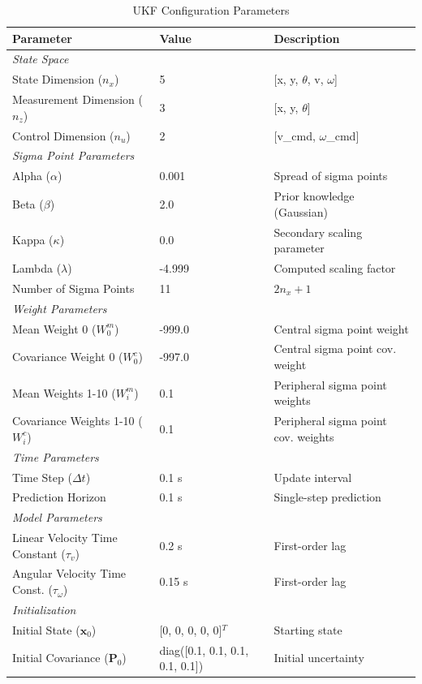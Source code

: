 \begin{table}[htbp]
\centering
\caption{UKF Configuration Parameters}
\label{tab:ukf_params}
\begin{tabular}{@{}lll@{}}
\toprule
\textbf{Parameter} & \textbf{Value} & \textbf{Description} \\
\midrule
\multicolumn{3}{l}{\textit{State Space}} \\
State Dimension ($n_x$) & 5 & [x, y, $\theta$, v, $\omega$] \\
Measurement Dimension ($n_z$) & 3 & [x, y, $\theta$] \\
Control Dimension ($n_u$) & 2 & [v\_cmd, $\omega$\_cmd] \\
\midrule
\multicolumn{3}{l}{\textit{Sigma Point Parameters}} \\
Alpha ($\alpha$) & 0.001 & Spread of sigma points \\
Beta ($\beta$) & 2.0 & Prior knowledge (Gaussian) \\
Kappa ($\kappa$) & 0.0 & Secondary scaling parameter \\
Lambda ($\lambda$) & -4.999 & Computed scaling factor \\
Number of Sigma Points & 11 & $2n_x + 1$ \\
\midrule
\multicolumn{3}{l}{\textit{Weight Parameters}} \\
Mean Weight 0 ($W_0^m$) & -999.0 & Central sigma point weight \\
Covariance Weight 0 ($W_0^c$) & -997.0 & Central sigma point cov. weight \\
Mean Weights 1-10 ($W_i^m$) & 0.1 & Peripheral sigma point weights \\
Covariance Weights 1-10 ($W_i^c$) & 0.1 & Peripheral sigma point cov. weights \\
\midrule
\multicolumn{3}{l}{\textit{Time Parameters}} \\
Time Step ($\Delta t$) & 0.1 s & Update interval \\
Prediction Horizon & 0.1 s & Single-step prediction \\
\midrule
\multicolumn{3}{l}{\textit{Model Parameters}} \\
Linear Velocity Time Constant ($\tau_v$) & 0.2 s & First-order lag \\
Angular Velocity Time Const. ($\tau_\omega$) & 0.15 s & First-order lag \\
\midrule
\multicolumn{3}{l}{\textit{Initialization}} \\
Initial State ($\mathbf{x}_0$) & [0, 0, 0, 0, 0]$^T$ & Starting state \\
Initial Covariance ($\mathbf{P}_0$) & diag([0.1, 0.1, 0.1, 0.1, 0.1]) & Initial uncertainty \\
\bottomrule
\end{tabular}
\end{table}

